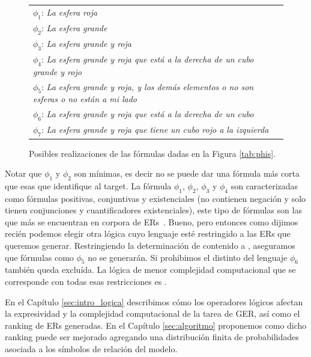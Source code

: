 \begin{figure}[H]

\begin{tabular}{l}
 $\phi_1$: {\it La esfera roja}\\[1pt]
 $\phi_2$: {\it La esfera grande}\\[1pt]
 $\phi_3$: {\it La esfera grande y roja}\\[1pt]
 $\phi_4$: {\it La esfera grande y roja que est\'a a la derecha de un cubo grande y rojo}\\[1pt]
 $\phi_5$: {\it La esfera grande y roja, y los dem\'as elementos o no son esferas o no est\'an a mi lado}\\[1pt]
 $\phi_6$: {\it La esfera grande y roja que est\'a a la derecha de un cubo}\\[1pt]
 $\phi_7$: {\it La esfera grande y roja que tiene un cubo rojo a la izquierda}\\[1pt]
\end{tabular}
\caption{Posibles realizaciones de las f\'ormulas dadas en la Figura \protect\ref{tab:phis}.}\label{tab:realizaciones-phis}
\end{figure}

Notar que $\phi_1$ y $\phi_2$ son m\'inimas, es decir no se puede dar una f\'ormula m\'as corta que esas que identifique al target.
La f\'ormula $\phi_1$, $\phi_2$, $\phi_3$ y $\phi_4$ son caracterizadas como f\'ormulas positivas, conjuntivas y existenciales (no contienen negaci\'on y solo tienen conjunciones y cuantificadores existenciales), este tipo de f\'ormulas son las que m\'as se encuentran en corpora de ERs~\cite{viethen06:_algor_for_gener_refer_expres,deemter06:_build_seman_trans_corpus_for,gre3d3}. Bueno, pero entonces como dijimos reci\'en podemos elegir otra l\'ogica cuyo lenguaje est\'e restringido a las ERs que queremos generar. Restringiendo la determinaci\'on de contenido a \EPFOL, aseguramos que f\'ormulas como  $\phi_5$ no se generar\'an. Si prohibimos el distinto del lenguaje $\phi_6$ tambi\'en queda exclu\'ida. La l\'ogica de menor complejidad computacional que se corresponde con todas esas restricciones es \EL. 

En el Cap\'itulo \ref{sec:intro_logica} describimos c\'omo los operadores l\'ogicos afectan la expresividad y la complejidad computacional de la tarea de GER, as\'i como el ranking de ERs generadas. En el Cap\'itulo \ref{sec:algoritmo} proponemos como dicho ranking puede ser mejorado agregando una distribuci\'on finita de probabilidades asociada a los s\'imbolos de relaci\'on del modelo.



